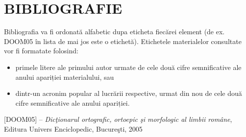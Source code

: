 \chapter{BIBLIOGRAFIE}

\begin{singlespace}
\fontsize{12}{11}\selectfont
Bibliografia va fi ordonată alfabetic dupa eticheta fiecărei element (de ex. 
DOOM05 în lista de mai jos este o etichetă). Etichetele materialelor consultate 
vor fi formatate folosind:

\begin{itemize}
    \item primele litere ale primului autor urmate de cele două cifre semnificative ale anului apariției materialului, sau
    \item dintr-un acronim popular al lucrării respective, urmat din nou de cele două cifre semnificative ale anului apariției.
\end{itemize}


[DOOM05] – \textit{Dicţionarul ortografic, ortoepic şi morfologic al limbii române}, Editura Univers Enciclopedic, Bucureşti, 2005  
\end{singlespace}

